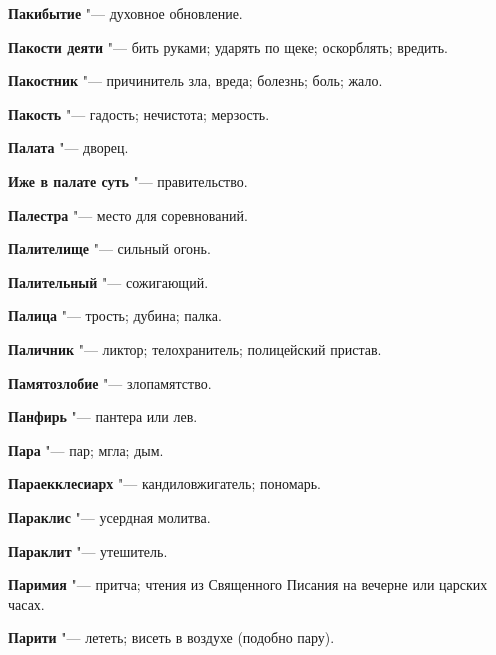 \begin{mymulticols}{2}
\noindent\textbf{Пакибытие} "--- духовное обновление. 




\noindent\textbf{Пакости деяти} "--- бить руками; ударять по щеке; оскорблять; вредить. 




\noindent\textbf{Пакостник} "--- причинитель зла, вреда; болезнь; боль; жало. 




\noindent\textbf{Пакость} "--- гадость; нечистота; мерзость. 




\noindent\textbf{Палата} "--- дворец. 




\noindent\textbf{Иже в палате суть} "--- правительство. 




\noindent\textbf{Палестра} "--- место для соревнований. 




\noindent\textbf{Палителище} "--- сильный огонь. 




\noindent\textbf{Палительный} "--- сожигающий. 




\noindent\textbf{Палица} "--- трость; дубина; палка. 




\noindent\textbf{Паличник} "--- ликтор; телохранитель; полицейский пристав. 




\noindent\textbf{Памятозлобие} "--- злопамятство. 




\noindent\textbf{Панфирь} "--- пантера или лев. 




\noindent\textbf{Пара} "--- пар; мгла; дым. 




\noindent\textbf{Параекклесиарх} "--- кандиловжигатель; пономарь. 




\noindent\textbf{Параклис} "--- усердная молитва. 




\noindent\textbf{Параклит} "--- утешитель. 




\noindent\textbf{Паримия} "--- притча; чтения из Священного Писания на вечерне или царских часах. 




\noindent\textbf{Парити} "--- лететь; висеть в воздухе (подобно пару). 





\end{mymulticols}
